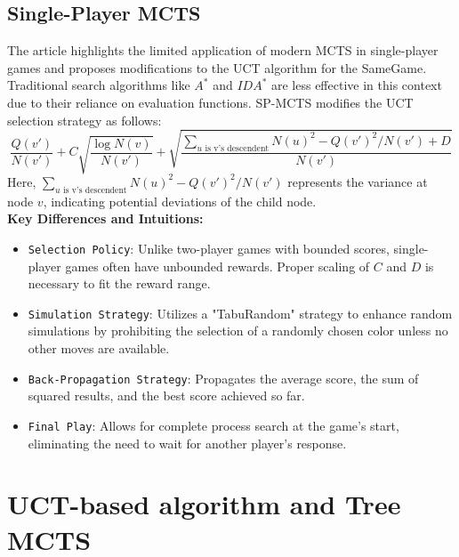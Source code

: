 \documentclass[11pt]{article}
\theoremstyle{definitionstyle}
\begin{document}
\subsection{Single-Player MCTS}
The article \cite{schadd2008single} highlights the limited application of modern MCTS in single-player games and proposes modifications to the UCT algorithm for the SameGame. Traditional search algorithms like $A^*$ and $IDA^*$ are less effective in this context due to their reliance on evaluation functions. SP-MCTS modifies the UCT selection strategy as follows:
\[ 
\frac{Q(v')}{N(v')} + C \sqrt{\frac{\log N(v)}{N(v')}} + \sqrt{\frac{\sum_{u \text{ is v's descendent}} N(u)^2 - Q(v')^2 / N(v') + D}{N(v')}}
\]
Here, $\sum_{u \text{ is v's descendent}} N(u)^2 - Q(v')^2 / N(v')$ represents the variance at node $v$, indicating potential deviations of the child node.\\
\textbf{Key Differences and Intuitions:}
\begin{itemize}
    \item \texttt{Selection Policy}: Unlike two-player games with bounded scores, single-player games often have unbounded rewards. Proper scaling of $C$ and $D$ is necessary to fit the reward range.
    \item \texttt{Simulation Strategy}: Utilizes a "TabuRandom" strategy to enhance random simulations by prohibiting the selection of a randomly chosen color unless no other moves are available.
    \item \texttt{Back-Propagation Strategy}: Propagates the average score, the sum of squared results, and the best score achieved so far.
    \item \texttt{Final Play}: Allows for complete process search at the game's start, eliminating the need to wait for another player's response.
\end{itemize}
\section{UCT-based algorithm and Tree MCTS}
\end{document}
